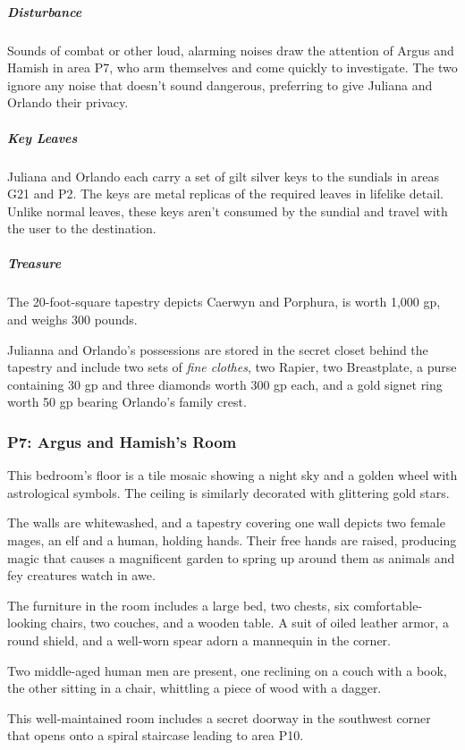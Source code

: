 \documentclass[10pt,a4paper,twoside,bg=print,twocolumn,openany,nodeprecatedcode]{dndbook}
\begin{document}
\subparagraph{Disturbance}
Sounds of combat or other loud, alarming noises draw the attention of Argus and Hamish in area P7, who arm themselves and come quickly to investigate. The two ignore any noise that doesn't sound dangerous, preferring to give Juliana and Orlando their privacy.

\subparagraph{Key Leaves}
Juliana and Orlando each carry a set of gilt silver keys to the sundials in areas G21 and P2. The keys are metal replicas of the required leaves in lifelike detail. Unlike normal leaves, these keys aren't consumed by the sundial and travel with the user to the destination.

\subparagraph{Treasure}
The 20-foot-square tapestry depicts Caerwyn and Porphura, is worth 1,000 gp, and weighs 300 pounds.

Julianna and Orlando's possessions are stored in the secret closet behind the tapestry and include two sets of \textit{fine clothes}, two Rapier, two Breastplate, a purse containing 30 gp and three diamonds worth 300 gp each, and a gold signet ring worth 50 gp bearing Orlando's family crest.

\subsubsection{P7: Argus and Hamish's Room}
\begin{DndReadAloud}{}
This bedroom's floor is a tile mosaic showing a night sky and a golden wheel with astrological symbols. The ceiling is similarly decorated with glittering gold stars.

The walls are whitewashed, and a tapestry covering one wall depicts two female mages, an elf and a human, holding hands. Their free hands are raised, producing magic that causes a magnificent garden to spring up around them as animals and fey creatures watch in awe.

The furniture in the room includes a large bed, two chests, six comfortable-looking chairs, two couches, and a wooden table. A suit of oiled leather armor, a round shield, and a well-worn spear adorn a mannequin in the corner.

Two middle-aged human men are present, one reclining on a couch with a book, the other sitting in a chair, whittling a piece of wood with a dagger.

\end{DndReadAloud}

This well-maintained room includes a secret doorway in the southwest corner that opens onto a spiral staircase leading to area P10.
\end{document}
